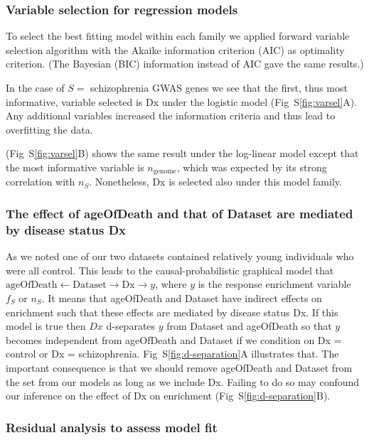 \documentclass[letterpaper]{article}
\begin{document}
\subsubsection*{Variable selection for regression models}

To select the best fitting model within each family we applied forward
variable selection algorithm with the Akaike information criterion (AIC) as
optimality criterion.  (The Bayesian (BIC) information instead of AIC gave the
same results.)

In the case of \(S =\) schizophrenia GWAS genes we see that the first,
thus most informative, variable selected is Dx under the logistic model
(Fig~S\ref{fig:varsel}A).
Any additional variables increased the information criteria and thus lead to
overfitting the data.

(Fig~S\ref{fig:varsel}B) shows the same result under the log-linear model except that the
most informative variable is \(n_\mathrm{genome}\), which was expected by its
strong correlation with \(n_S\).  Nonetheless, Dx is selected also under this
model family.

\subsubsection*{The effect of ageOfDeath and that of Dataset are mediated by disease status Dx}

As we noted one of our two datasets contained relatively young individuals who
were all control.  This leads to the causal-probabilistic graphical model that
\(\mathrm{ageOfDeath} \leftarrow \mathrm{Dataset} \rightarrow \mathrm{Dx}
\rightarrow y\), where \(y\) is the response enrichment variable \(f_S\) or
\(n_S\).  It means that ageOfDeath and Dataset have indirect effects on
enrichment such that these effects are mediated by disease status Dx. If this
model is true then \(Dx\) d-separates \(y\) from Dataset and ageOfDeath so
that \(y\) becomes independent from ageOfDeath and Dataset if we condition on
Dx = control or Dx = schizophrenia.  Fig~S\ref{fig:d-separation}A illustrates
that.  The important consequence is that we should remove ageOfDeath and
Dataset from the set from our models as long as we include Dx.  Failing to do
so may confound our inference on the effect of Dx on enrichment
(Fig~S\ref{fig:d-separation}B).

\subsubsection*{Residual analysis to assess model fit }
\end{document}
